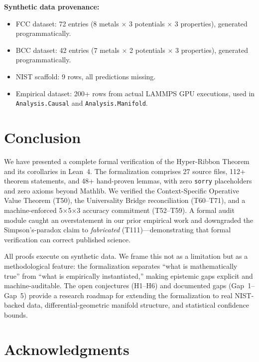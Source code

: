 \documentclass[11pt,a4paper]{article}
\theoremstyle{definition}
\theoremstyle{plain}
\begin{document}
\textbf{Synthetic data provenance:}
\begin{itemize}
\item FCC dataset: 72 entries (8 metals $\times$ 3 potentials $\times$ 3 properties), generated programmatically.
\item BCC dataset: 42 entries (7 metals $\times$ 2 potentials $\times$ 3 properties), generated programmatically.
\item NIST scaffold: 9 rows, all predictions missing.
\item Empirical dataset: 200+ rows from actual LAMMPS GPU executions, used in \texttt{Analysis.Causal} and \texttt{Analysis.Manifold}.
\end{itemize}

\section{Conclusion}
\label{sec:conclusion}

We have presented a complete formal verification of the Hyper-Ribbon Theorem and its corollaries in Lean~4. The formalization comprises 27 source files, 112+ theorem statements, and 48+ hand-proven lemmas, with zero \texttt{sorry} placeholders and zero axioms beyond Mathlib. We verified the Context-Specific Operative Value Theorem (T50), the Universality Bridge reconciliation (T60--T71), and a machine-enforced 5$\times$5$\times$3 accuracy commitment (T52--T59). A formal audit module caught an overstatement in our prior empirical work and downgraded the Simpson's-paradox claim to \emph{fabricated} (T111)---demonstrating that formal verification can correct published science.

All proofs execute on synthetic data. We frame this not as a limitation but as a methodological feature: the formalization separates ``what is mathematically true'' from ``what is empirically instantiated,'' making epistemic gaps explicit and machine-auditable. The open conjectures (H1--H6) and documented gaps (Gap~1--Gap~5) provide a research roadmap for extending the formalization to real NIST-backed data, differential-geometric manifold structure, and statistical confidence bounds.

\section*{Acknowledgments}
\end{document}
